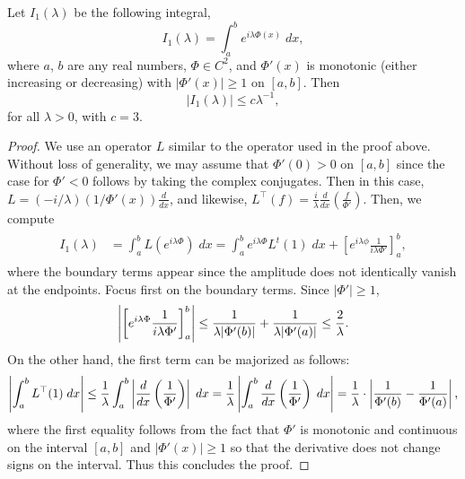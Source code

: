 \documentclass{article}
\begin{document}
\begin{prop}
	Let $I_{1}(\lambda)$ be the following integral, 
	\begin{equation*}
		I_{1}(\lambda) = \int_{a}^{b}e^{i\lambda \Phi(x)}\;dx, 
	\end{equation*} 
	where $a$, $b$ are any real numbers, $\Phi \in C^{2}$, and $\Phi'(x)$ is monotonic (either increasing or decreasing) with $|\Phi'(x)| \geq 1$ on $[a, b]$. Then 
	\begin{equation*}
		|I_{1}(\lambda)| \leq c\lambda^{-1},
	\end{equation*} 
	for all $\lambda > 0$, with $c = 3$. 
\end{prop} 
\begin{proof}
	We use an operator $L$ similar to the operator used in the proof above. Without loss of generality, we may assume that $\Phi'(0) > 0$ on $[a, b]$ since the case for $\Phi' < 0$ follows by taking the complex conjugates. Then in this case, $L = (-i/\lambda) (1/\Phi'(x))\frac{d}{dx}$, and likewise, $L^{\top}(f) = \frac{i}{\lambda}\frac{d}{dx}\left(\frac{f}{\Phi'}\right)$. Then, we compute 
	\begin{align*}
		\begin{split}
			I_{1}(\lambda) &= \int_{a}^{b}L(e^{i\lambda \Phi})\;dx = \int_{a}^{b}e^{i\lambda \Phi}L^{t}(1)\;dx + \left[e^{i\lambda \phi}\frac{1}{i\lambda \Phi'}\right]_{a}^{b}, 
		\end{split} 
	\end{align*}
	where the boundary terms appear since the amplitude does not identically vanish at the endpoints. Focus first on the boundary terms. Since $|\Phi'| \geq 1$, 
	\begin{equation*}
		\left| \left[e^{i\lambda\Phi}\frac{1}{i\lambda \Phi'}\right]_{a}^{b} \right| \leq \frac{1}{\lambda |\Phi'(b)|} + \frac{1}{\lambda |\Phi'(a)|} \leq \frac{2}{\lambda}. 
	\end{equation*} 
	On the other hand, the first term can be majorized as follows: 
	\begin{equation*}
		\left| \int_{a}^{b}L^{\top}(1)\;dx \right| \leq \frac{1}{\lambda}\int_{a}^{b}\left| \frac{d}{dx}\left(\frac{1}{\Phi'}\right) \right|\;dx = \frac{1}{\lambda}\left| \int_{a}^{b}\frac{d}{dx}\left(\frac{1}{\Phi'}\right)\;dx \right| = \frac{1}{\lambda} \cdot \left| \frac{1}{\Phi'(b)} - \frac{1}{\Phi'(a)} \right|, 
	\end{equation*} 
	where the first equality follows from the fact that $\Phi'$ is monotonic and continuous on the interval $[a, b]$ and $|\Phi'(x)| \geq 1$ so that the derivative does not change signs on the interval. Thus this concludes the proof. 
\end{proof} 
\end{document}
